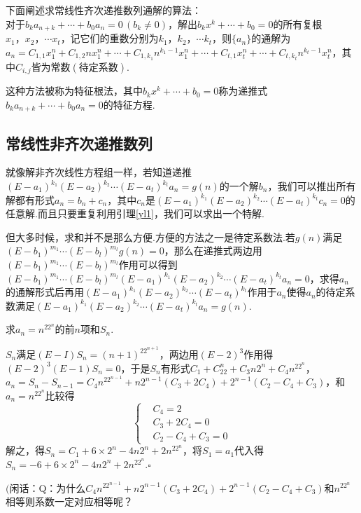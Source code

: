 \documentclass[10pt]{article}
\newcommand*{\QEDB}{\hfill\ensuremath{\square}}  %
\newcommand*{\D}{\text{，}}
\numberwithin{equation}{section}
\begin{document}
下面阐述求常线性齐次递推数列通解的算法：\\
\indent 对于$b_ka_{n+k}+\cdots+b_0a_n = 0\,(b_k \ne 0)$，解出$b_kx^k+\cdots+b_0 = 0$的所有复根$x_1\D x_2 \D \cdots x_t$，记它们的重数分别为$k_1\D k_2 \D \cdots k_t$，则$\{a_n\}$的通解为$a_n = C_{1,1}x_1^n + C_{1,2}nx_1^n + \cdots + C_{1,k_1}n^{k_1-1}x_1^n + \cdots + C_{t,1}x_t^n + \cdots + C_{t,k_t}n^{k_t-1}x_t^n$，其中$C_{i,j}$皆为常数$(\text{待定系数})$.
\par 这种方法被称为{\zhht 特征根法}，其中$b_kx^k+\cdots+b_0 = 0$称为递推式$b_ka_{n+k}+\cdots+b_0a_n = 0$的{\zhht 特征方程}.
\subsection{常线性非齐次递推数列}
就像解非齐次线性方程组一样，若知道递推$(E-a_1)^{k_1}(E-a_2)^{k_2}\cdots (E-a_t)^{k_t}a_n = g(n)$的一个解$b_n$，我们可以推出所有解都有形式$a_n = b_n + c_n$，其中$c_n$是$(E-a_1)^{k_1}(E-a_2)^{k_2}\cdots (E-a_t)^{k_t}c_n = 0$的任意解.而且只要重复利用引理\ref{yl1}，我们可以求出一个特解.
\par 但大多时候，求和并不是那么方便.方便的方法之一是待定系数法.若$g(n)$满足$(E-b_1)^{m_1}\cdots (E-b_l)^{m_l}g(n) = 0$，那么在递推式两边用$(E-b_1)^{m_1}\cdots (E-b_l)^{m_l}$作用可以得到$(E-b_1)^{m_1}\cdots (E-b_l)^{m_l}(E-a_1)^{k_1}(E-a_2)^{k_2}\cdots (E-a_t)^{k_t}a_n = 0$，求得$a_n$的通解形式后再用$(E-a_1)^{k_1}(E-a_2)^{k_2}\cdots (E-a_t)^{k_t}$作用于$a_n$使得$a_n$的待定系数满足$(E-a_1)^{k_1}(E-a_2)^{k_2}\cdots (E-a_t)^{k_t}a_n = g(n)$.
\begin{LT}
    求$a_n = n^22^n$的前$n$项和$S_n$.
\end{LT}
\begin{JT}
    $S_n$满足$(E-I)S_n = (n+1)^22^{n+1}$，两边用$(E-2)^3$作用得$(E-2)^3(E-1)S_n = 0$，于是$S_n$有形式$C_1+C_22^n+C_3n2^n+C_4n^22^n$，$a_n = S_n - S_{n-1} = C_4n^22^{n-1}+n2^{n-1}(C_3+2C_4)+2^{n-1}(C_2-C_4+C_3)$，和$a_n = n^22^n$比较得
    \[
        \left\{
        \begin{aligned}
            &C_4 = 2 \\
            &C_3+2C_4 = 0 \\
            &C_2-C_4+C_3 =  0
        \end{aligned}
        \right.
    \]
    解之，得$S_n = C_1+6\times 2^n-4n2^n+2n^22^n$，将$S_1 = a_1$代入得$S_n = -6+6\times 2^n-4n2^n+2n^22^n$.\QEDB
\end{JT}
$($闲话：Q：为什么$C_4n^22^{n-1}+n2^{n-1}(C_3+2C_4)+2^{n-1}(C_2-C_4+C_3)$和$n^22^n$相等则系数一定对应相等呢？\\
\end{document}
